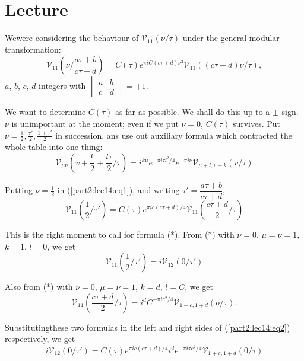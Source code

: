 \chapter{Lecture}\label{part2:lec14} %

We\pageoriginale were considering the behaviour of $\mathscr{V}_{11}
(\nu /\tau)$ under the general modular transformation:
\begin{equation*}
  \mathscr{V}_{11} \left(\nu \Big/ \frac{a \tau +b}{c \tau+d} \right)=
  C(\tau) e^{\pi i C(c \tau +d)\nu^2} \mathscr{V}_{11} ((c \tau +d)
  \nu /\tau), \tag{1}\label{part2:lec14:eq1} 
\end{equation*}
$a$, $b$, $c$, $d$ integers with $\begin{vmatrix} a & b\\ c &
  d\end{vmatrix} = +1$.

We want to determine $C(\tau)$ as far as possible. We shall do this up
to a $\pm$ sign. $\nu$ is unimportant at the moment; even if we put
$\nu=0$, $C(\tau)$ survives. Put $\nu = \frac{1}{2}, \frac{\tau'}{2},
\frac{1+\tau'}{2}$ in succession, ans use out auxiliary formula which
contracted the whole table into one thing:
\begin{equation*}
  \mathscr{V}_{\mu \nu} \left(v + \frac{k}{2} + \frac{l \tau}{2}\Big/
  \tau\right)= i^{k \mu} e^{-\pi i \tau l^2/4} e^{-\pi i \nu}
  \mathscr{V}_{\mu+l, v+k} (v /\tau)\tag{*}\label{part2:lec14:eq*}
\end{equation*}

Putting $\nu = \frac{1}{2}$ in (\ref{part2:lec14:eq1}), and writing $\tau'= \dfrac{a
  \tau+b}{c\tau+d}$, 
\begin{equation*}
  \mathscr{V}_{11} \left( \frac{1}{2} \Big/ \tau'\right)= C(\tau)
  e^{\pi i c (c \tau+d)/4} \mathscr{V}_{11} \left(\frac{c \tau+d}{2}
  \Big/ \tau\right)\tag{2}\label{part2:lec14:eq2}
\end{equation*}

This is the right moment to call for formula (*). From (*) with
$\nu=0$, $\mu=\nu= 1$, $k=1$, $l=0$, we get 
$$
\mathscr{V}_{11} \left( \frac{1}{2} \Big/ \tau'\right) = i
\mathscr{V}_{12} (0/ \tau')
$$

Also from (*) with $\nu=0$, $\mu=\nu=1$, $k=d$, $l=C$, we get 
$$
\mathscr{V}_{11} \left( \frac{c \tau+d}{2} \Big/ \tau\right)=
i^{d}C^{- \pi i c^2/4} \mathscr{V}_{1+c, 1+d} (o/\tau). 
$$

Substituting\pageoriginale these two formulas in the left and right 
sides of (\ref{part2:lec14:eq2}) respectively, we get 
$$
i \mathscr{V}_{12} (0/ \tau') = C(\tau) e^{\pi i c (c \tau +d)/4}
i^{d} e^{- \pi i \tau c^2/4} \mathscr{V}_{1+c, 1+d} (0/ \tau)
$$

